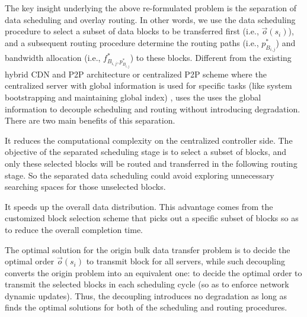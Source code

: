 The key insight underlying the above re-formulated problem is the
separation of data scheduling and overlay routing.
In other words, we use the data scheduling procedure to select a subset of data blocks to be transferred first
(i.e., $\overrightarrow{o}(s_i)$),
and a subsequent routing procedure determine the routing paths
(i.e., $p_{B_{i,j}}^*$)
and bandwidth allocation (i.e., $f^*_{B_{i,j},p_{B_{i,j}}^*}$) to these blocks.
Different from the existing hybrid CDN and P2P architecture \cite{yin2009design} or centralized P2P scheme \cite{lee2003centralized} where the centralized server with global information is used for specific tasks (like system bootstrapping and maintaining global index) \cite{androutsellis2004survey}, \name uses the uses the global information to decouple scheduling and routing without introducing degradation.
There are two main benefits of this separation.
\begin{packedenumerate}
\item It reduces the computational complexity on the centralized controller side. The objective of the separated scheduling stage is to select a subset of blocks, and only these selected blocks will be routed and transferred in the following routing stage. So the separated data scheduling could avoid exploring unnecessary searching spaces for those unselected blocks.
\item It speeds up the overall data distribution. This advantage comes from the customized block selection scheme that picks out a specific subset of blocks so as to reduce the overall completion time.
\end{packedenumerate}

The optimal solution for the origin bulk data transfer problem is to decide the optimal order $\overrightarrow{o}(s_i)$ to transmit block for all servers, while such decoupling converts the origin problem into an equivalent one: to decide the optimal order to transmit the selected blocks in each scheduling cycle (so as to enforce network dynamic updates). Thus, the decoupling introduces no degradation as long as \name finds the optimal solutions for both of the scheduling and routing procedures.


